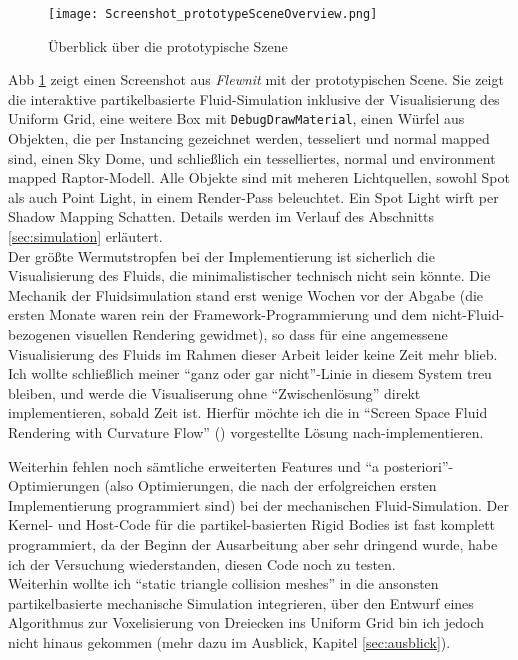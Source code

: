   	
  	\begin{figure}[!h]
		\texttt{[image: Screenshot\_prototypeSceneOverview.png]}
		\caption{Überblick über die prototypische Szene}
		\label{fig:Screenshot_prototypeSceneOverview}
	\end{figure}
	
	Abb \ref{fig:Screenshot_prototypeSceneOverview} zeigt einen Screenshot aus \emph{Flewnit} 
	mit der prototypischen Scene. Sie zeigt die interaktive partikelbasierte
	Fluid-Simulation inklusive der Visualisierung des Uniform Grid, eine weitere Box mit 
	\linebreak \lstinline|DebugDrawMaterial|,
	einen Würfel aus Objekten, die per Instancing gezeichnet werden, tesseliert und normal mapped sind,
	einen Sky Dome, und schließlich ein tesselliertes, normal und environment mapped Raptor-Modell.
	Alle Objekte sind mit meheren Lichtquellen, sowohl Spot als auch Point Light, in einem Render-Pass beleuchtet.
	Ein Spot Light wirft per Shadow Mapping Schatten.  
	Details werden im Verlauf des Abschnitts \ref{sec:simulation} erläutert.\\
  	
  	Der größte Wermutstropfen bei der Implementierung ist sicherlich die Visualisierung des Fluids, die minimalistischer
  	technisch nicht sein könnte. Die Mechanik der Fluidsimulation stand erst wenige Wochen vor der 
  	Abgabe (die ersten Monate waren rein der Framework-Programmierung und dem nicht-Fluid-bezogenen
  	visuellen Rendering gewidmet), 
  	so dass für eine angemessene Visualisierung des Fluids im Rahmen dieser Arbeit leider keine Zeit mehr blieb.
  	Ich wollte schließlich meiner "`ganz oder gar nicht"'-Linie in diesem System treu bleiben, und werde die Visualiserung
  	ohne "`Zwischenlösung"' direkt implementieren, sobald Zeit ist. Hierfür möchte ich die in
  	"`Screen Space Fluid Rendering with Curvature Flow"' (\cite{Green2009FluidRenderingCurvatureFlow})
  	vorgestellte Lösung nach-implementieren.
  	
  	Weiterhin fehlen noch sämtliche erweiterten Features und "`a posteriori"'-Optimierungen (also Optimierungen, die 
  	nach der erfolgreichen ersten Implementierung programmiert sind) bei der mechanischen Fluid-Simulation.
  	Der Kernel- und Host-Code für die partikel-basierten Rigid Bodies ist fast komplett programmiert,
  	da der Beginn der Ausarbeitung aber sehr dringend wurde, habe ich der Versuchung wiederstanden,
  	diesen Code noch zu testen.\\
  	Weiterhin wollte ich "`static triangle collision meshes"' in die ansonsten partikelbasierte
  	mechanische Simulation integrieren, über den Entwurf eines
  	Algorithmus zur Voxelisierung von Dreiecken ins Uniform Grid bin ich jedoch nicht hinaus gekommen 
  	(mehr dazu im Ausblick, Kapitel \ref{sec:ausblick}).
  

